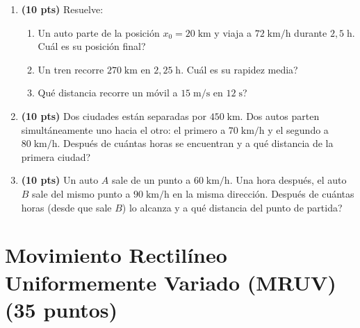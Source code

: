 \documentclass[12pt, letterpaper]{article}
\begin{document}
\begin{enumerate}[leftmargin=*]
  \item \textbf{(10 pts)} Resuelve:
        \begin{enumerate}[label=\alph*)]
          \item Un auto parte de la posición $x_0 = 20\;\text{km}$ y viaja a $72\;\text{km/h}$ durante $2{,}5\;\text{h}$. \textquestiondown Cuál es su posición final?
          \item Un tren recorre $270\;\text{km}$ en $2{,}25\;\text{h}$. \textquestiondown Cuál es su rapidez media?
          \item \textquestiondown Qué distancia recorre un móvil a $15\;\text{m/s}$ en $12\;\text{s}$?
        \end{enumerate}

  \item \textbf{(10 pts)} Dos ciudades están separadas por $450\;\text{km}$. Dos autos parten simultáneamente uno hacia el otro: el primero a $70\;\text{km/h}$ y el segundo a $80\;\text{km/h}$. \textquestiondown Después de cuántas horas se encuentran y a qué distancia de la primera ciudad?

  \item \textbf{(10 pts)} Un auto $A$ sale de un punto a $60\;\text{km/h}$. Una hora después, el auto $B$ sale del mismo punto a $90\;\text{km/h}$ en la misma dirección. \textquestiondown Después de cuántas horas (desde que sale $B$) lo alcanza y a qué distancia del punto de partida?
\end{enumerate}

\newpage

\section{Movimiento Rectilíneo Uniformemente Variado (MRUV) (35 puntos)}
\end{document}

